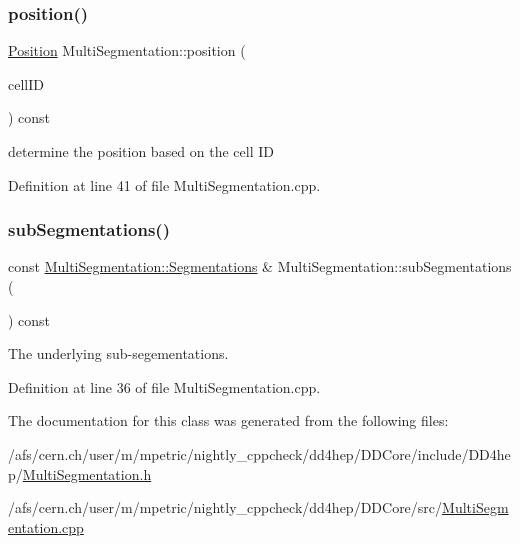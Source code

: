 \subsubsection{\texorpdfstring{position()}{position()}}
{\footnotesize\ttfamily \hyperlink{namespace_d_d4hep_1_1_geometry_a55083902099d03506c6db01b80404900}{Position} Multi\+Segmentation\+::position (\begin{DoxyParamCaption}\item[{const Cell\+ID \&}]{cell\+ID }\end{DoxyParamCaption}) const}



determine the position based on the cell ID 



Definition at line 41 of file Multi\+Segmentation.\+cpp.

\hypertarget{class_d_d4hep_1_1_geometry_1_1_multi_segmentation_ad6c4a7d2d7405c4e910a14c01a42829d}{}\label{class_d_d4hep_1_1_geometry_1_1_multi_segmentation_ad6c4a7d2d7405c4e910a14c01a42829d} 
\subsubsection{\texorpdfstring{sub\+Segmentations()}{subSegmentations()}}
{\footnotesize\ttfamily const \hyperlink{class_d_d4hep_1_1_geometry_1_1_multi_segmentation_ae2c7165290144f20af27248eab1858c5}{Multi\+Segmentation\+::\+Segmentations} \& Multi\+Segmentation\+::sub\+Segmentations (\begin{DoxyParamCaption}{ }\end{DoxyParamCaption}) const}



The underlying sub-\/segementations. 



Definition at line 36 of file Multi\+Segmentation.\+cpp.



The documentation for this class was generated from the following files\+:\begin{DoxyCompactItemize}
\item 
/afs/cern.\+ch/user/m/mpetric/nightly\+\_\+cppcheck/dd4hep/\+D\+D\+Core/include/\+D\+D4hep/\hyperlink{_d_d_core_2include_2_d_d4hep_2_multi_segmentation_8h}{Multi\+Segmentation.\+h}\item 
/afs/cern.\+ch/user/m/mpetric/nightly\+\_\+cppcheck/dd4hep/\+D\+D\+Core/src/\hyperlink{_d_d_core_2src_2_multi_segmentation_8cpp}{Multi\+Segmentation.\+cpp}\end{DoxyCompactItemize}
